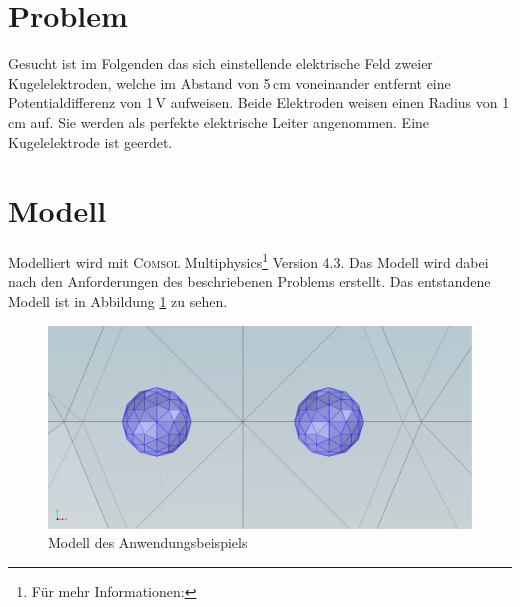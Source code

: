 \documentclass[a4paper,12pt,oneside,openright,onecolumn,final,titlepage,fleqn,ngerman]{scrreprt}
\begin{document}
	\section{Problem}
	Gesucht ist im Folgenden das sich einstellende elektrische Feld zweier Kugelelektroden, welche im Abstand von 5\,cm voneinander entfernt eine Potentialdifferenz von 1\,V aufweisen. Beide Elektroden weisen einen Radius von 1\,cm auf. Sie werden als perfekte elektrische Leiter angenommen. Eine Kugelelektrode ist geerdet.
	
	\section{Modell}
	Modelliert wird mit \textsc{Comsol} Multiphysics\footnote{Für mehr Informationen: } Version 4.3. Das Modell wird dabei nach den Anforderungen des beschriebenen Problems erstellt. Das entstandene Modell ist in Abbildung \ref{fig_bsp_model} zu sehen.
	\begin{figure}[ht]
		\includegraphics[keepaspectratio=true,width=\textwidth]{res/bsp_model.png}
		\caption{Modell des Anwendungsbeispiels}
		\label{fig_bsp_model}
	\end{figure}
	
\end{document}
